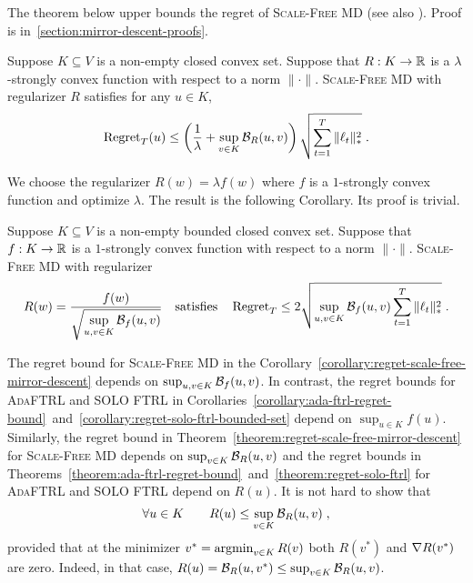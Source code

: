 The theorem below upper bounds the regret of \textsc{Scale-Free MD} (see also
\cite{Duchi-Hazan-Singer-2011, Duchi-Shalev-Shwartz-Singer-Tewari-2010,
Rakhlin-Sridharan-2013}).  Proof is in~\ref{section:mirror-descent-proofs}.

\begin{theorem}
\label{theorem:regret-scale-free-mirror-descent}
Suppose $K \subseteq V$ is a non-empty closed convex set. Suppose that $R:K
\to \mathbb{R}$ is a $\lambda$-strongly convex function with respect to a norm
$\|\cdot\|$.  \textsc{Scale-Free MD} with regularizer $R$ satisfies
for any $u \in K$,
$$
\operatorname{Regret}_T(u)
\le
\left( \frac{1}{\lambda} + \sup_{v \in K} \mathcal{B}_R(u,v) \right) \sqrt{\sum_{t=1}^T \|\ell_t\|_*^2} \; .
$$
\end{theorem}

We choose the regularizer $R(w) = \lambda f(w)$ where $f$ is a $1$-strongly convex
function and optimize $\lambda$. The result is the following Corollary. Its
proof is trivial.

\begin{corollary}
\label{corollary:regret-scale-free-mirror-descent}
Suppose $K \subseteq V$ is a non-empty bounded closed convex set.  Suppose
that $f:K \to \mathbb{R}$ is a $1$-strongly convex function with respect to a norm
$\|\cdot\|$.  \textsc{Scale-Free MD} with regularizer
$$
R(w) = \frac{f(w)}{\displaystyle \sqrt{\sup_{u,v \in K} \Breg_f(u,v)}}
\quad \text{satisfies} \quad %
\Regret_T \le 2 \sqrt{\sup_{u,v \in K} \Breg_f(u,v) \sum_{t=1}^T \|\ell_t\|_*^2} \; .
$$
\end{corollary}

The regret bound for \textsc{Scale-Free MD} in the
Corollary~\ref{corollary:regret-scale-free-mirror-descent} depends on
$\sup_{u,v \in K} \mathcal{B}_f(u,v)$. In contrast, the regret bounds for
\textsc{AdaFTRL} and \textsc{SOLO FTRL} in
Corollaries~\ref{corollary:ada-ftrl-regret-bound}~and~\ref{corollary:regret-solo-ftrl-bounded-set}
depend on $\sup_{u \in K} f(u)$.  Similarly, the regret bound in
Theorem~\ref{theorem:regret-scale-free-mirror-descent} for \textsc{Scale-Free
MD} depends on $\sup_{v \in K} \mathcal{B}_R(u,v)$ and the regret bounds in
Theorems~\ref{theorem:ada-ftrl-regret-bound}~and~\ref{theorem:regret-solo-ftrl}
for \textsc{AdaFTRL} and \textsc{SOLO FTRL} depend on $R(u)$. It is not hard to
show that
\begin{equation}
\label{equation:regularizer-vs-divergence}
\forall u \in K \qquad R(u) \le \sup_{v \in K} \mathcal{B}_R(u,v) \; ,
\end{equation}
provided that at the minimizer $v^* = \operatorname*{argmin}_{v \in K} R(v)$ both $R(v^*)$ and
$\nabla R(v^*)$ are zero. Indeed, in that case, $R(u) = \mathcal{B}_R(u,v^*) \le
\sup_{v \in K} \mathcal{B}_R(u,v)$.

